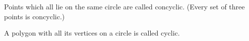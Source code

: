 Points which all lie on the same circle are called concyclic.
(Every set of three points is concyclic.)
\par
A polygon with all its vertices on a circle is called cyclic.